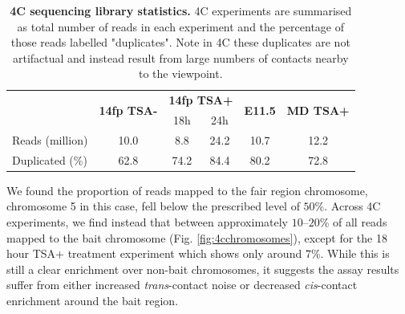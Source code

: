 \documentclass[a4paper,11pt,oneside]{book}
\begin{document}
\begin{table}[]
\centering
\caption[4C sequencing library statistics.]{ {\bf 4C sequencing library statistics.}
4C experiments are summarised as total number of reads in each experiment and the percentage of those reads labelled "duplicates". Note in 4C these duplicates are not artifactual and instead result from large numbers of contacts nearby to the viewpoint.
}
\label{tab:4c}
\begin{tabular}{l|c|cc|c|c|}
\cline{2-6}
                                      & \multirow{2}{*}{{\bf 14fp TSA-}} & \multicolumn{2}{c|}{{\bf 14fp TSA+}} & \multirow{2}{*}{{\bf E11.5}} & \multirow{2}{*}{{\bf MD TSA+}} \\
                                      &                                  & 18h               & 24h              &                              &                                \\ \hline
\multicolumn{1}{|l|}{Reads (million)} & 10.0                             & 8.8               & 24.2             & 10.7                         & 12.2                           \\
\multicolumn{1}{|l|}{Duplicated (\%)} & 62.8                             & 74.2              & 84.4             & 80.2                         & 72.8                           \\ \hline
\end{tabular}
\end{table}


We found the proportion of reads mapped to the fair region chromosome, chromosome 5 in this case, fell below the prescribed level of $50\%$. Across 4C experiments, we find instead that between approximately $10$--$20\%$ of all reads mapped to the bait chromosome (Fig. \ref{fig:4cchromosomes}), except for  the 18 hour TSA+ treatment experiment which shows only around $7\%$. While this is still a clear enrichment over non-bait chromosomes, it suggests the assay results suffer from either increased \emph{trans}-contact noise or decreased \emph{cis}-contact enrichment around the bait region. 
\end{document}
